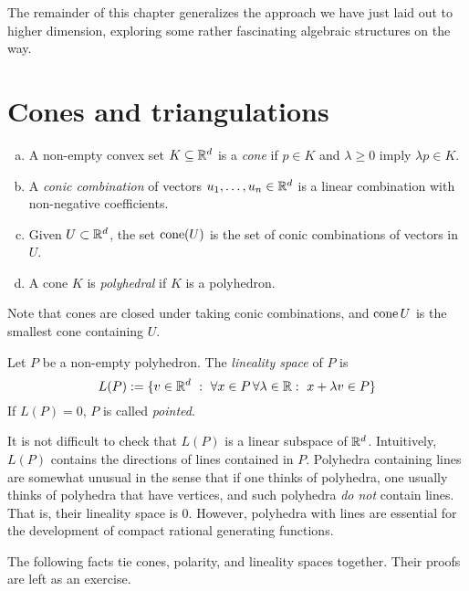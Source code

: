 The remainder of this chapter generalizes the approach we have just laid out to higher dimension,
exploring some rather fascinating algebraic structures on the way.



\section{Cones and triangulations}

\begin{definition}
  \begin{enumerate}[(a)]
    \item A non-empty convex set $K \subseteq \mathbb{R}^d$ is a \emph{cone}
      if $p \in K$ and $\lambda \geq 0$ imply $\lambda p \in K$.

    \item A \emph{conic combination} of vectors $u_1, \ldots, u_n \in \mathbb{R}^d$ is
      a linear combination with non-negative coefficients.

    \item Given $U \subset \mathbb{R}^d$, the set $\operatorname{cone}(U)$ is the set of conic combinations of vectors in $U$.

    \item A cone $K$ is \emph{polyhedral} if $K$ is a polyhedron.
  \end{enumerate}
\end{definition}

Note that cones are closed under taking conic combinations,
and $\operatorname{cone}{U}$ is the smallest cone containing $U$.

\begin{definition}
  Let $P$ be a non-empty polyhedron.
  The \emph{lineality space} of $P$ is
  \[
    L(P) := \{ v \in \mathbb{R}^d ~:~ \forall x\in P \,\forall \lambda \in \mathbb{R}:~ x + \lambda v \in P  \}
  \]
  If $L(P) = 0$, $P$ is called \emph{pointed}.
\end{definition}

It is not difficult to check that $L(P)$ is a linear subspace of $\mathbb{R}^d$.
Intuitively, $L(P)$ contains the directions of lines contained in $P$.
Polyhedra containing lines are somewhat unusual in the sense
that if one thinks of polyhedra, one usually thinks of polyhedra that have vertices,
and such polyhedra \emph{do not} contain lines.
That is, their lineality space is $0$.
However, polyhedra with lines are essential for the development of compact rational generating functions.

The following facts tie cones, polarity, and lineality spaces together.
Their proofs are left as an exercise.

